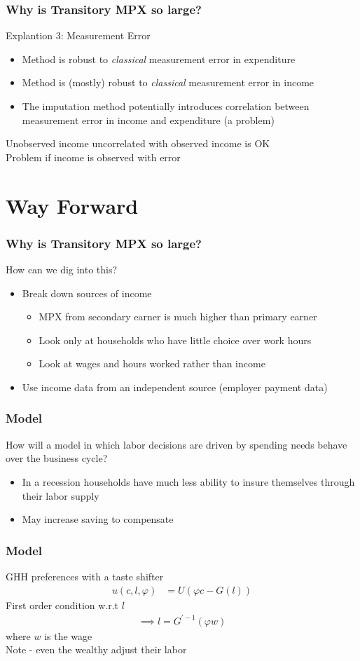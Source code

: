 \documentclass{beamer}
\begin{document}
\frame
{
	\frametitle{Why is Transitory MPX so large?}
	Explantion 3: Measurement Error\\
	\bigskip
	\begin{itemize}
		\item Method is robust to \textit{classical} measurement error in expenditure
		\item Method is (mostly) robust to \textit{classical} measurement error in income
		\item The imputation method potentially introduces correlation between measurement error in income and expenditure (a problem)
	\end{itemize}
	Unobserved income uncorrelated with observed income is OK\\
	Problem if income is observed with error
}
\section{Way Forward}
\frame
{
	\frametitle{Why is Transitory MPX so large?}
	How can we dig into this?\\
	\bigskip
	\begin{itemize}
		\item Break down sources of income
		\begin{itemize}
			\item MPX from secondary earner is much higher than primary earner
			\item Look only at households who have little choice over work hours
			\item Look at wages and hours worked rather than income
		\end{itemize}	
		\item Use income data from an independent source (employer payment data)
	\end{itemize}
}
\frame
{
	\frametitle{Model}
	How will a model in which labor decisions are driven by spending needs behave over the business cycle?\\
	\begin{itemize}
		\item In a recession households have much less ability to insure themselves through their labor supply
		\item May increase saving to compensate
	\end{itemize}
}
\frame
{
	\frametitle{Model}
	GHH preferences with a taste shifter
	\begin{align*}
	u(c,l,\varphi) &= U(\varphi c - G(l))
	\end{align*}
	First order condition w.r.t $l$
	\begin{align*}
	\implies l = G^{'-1}(\varphi w)
	\end{align*}
	where $w$ is the wage\\
	\bigskip
	Note - even the wealthy adjust their labor
}
\end{document}
